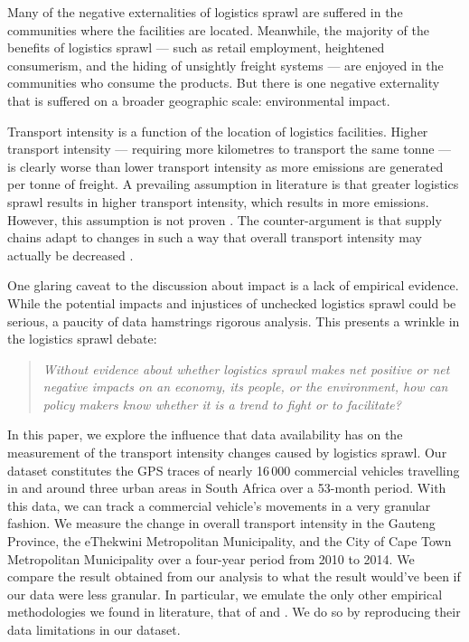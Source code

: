 \documentclass[3p, a4paper, authoryear, 11pt, fleqn, review]{elsarticle}
\newcommand{\nmt}[1]{{\color{red}{~(nmt: #1)}}}
\begin{document}
Many of the negative externalities of logistics sprawl are suffered in the communities where the facilities are located. Meanwhile, the majority of the benefits of logistics sprawl --- such as retail employment, heightened consumerism, and the hiding of unsightly freight systems --- are enjoyed in the communities who consume the products. But there is one negative externality that is suffered on a broader geographic scale: environmental impact. \nmt{Address for reviewer 3}

Transport intensity is a function of the location of logistics facilities. Higher transport intensity --- requiring more kilometres to transport the same tonne \nmt{address NA4 about energy efficiency} --- is clearly worse than lower transport intensity as more emissions are generated per tonne of freight. A prevailing assumption in literature is that greater logistics sprawl results in higher transport intensity, which results in more emissions. However, this assumption is not proven \citep{AljohaniThompson2016}. The counter-argument is that supply chains adapt to changes in such a way that overall transport intensity may actually be decreased \citep{Kang2020b, Sakai_etal2017}. 

One glaring caveat to the discussion about impact is a lack of empirical evidence. While the potential impacts and injustices of unchecked logistics sprawl could be serious, a paucity of data hamstrings rigorous analysis. This presents a wrinkle in the logistics sprawl debate: 


\begin{quote}
\emph{Without evidence about whether logistics sprawl makes net positive or net negative impacts on an economy, its people, or the environment, how can policy makers know whether it is a trend to fight or to facilitate? }
\end{quote}

\nmt{Can we move the research question sooner, here?}
\nmt{Restructure paragraph according to NA5}In this paper, we explore the influence that data availability has on the measurement of the transport intensity changes caused by logistics sprawl. Our dataset constitutes the GPS traces of nearly 16\,000 commercial vehicles travelling in and around three urban areas in South Africa over a 53-month period. With this data, we can track a commercial vehicle's movements in a very granular fashion. We measure the change in overall transport intensity in the Gauteng Province, the eThekwini Metropolitan Municipality, and the City of Cape Town Metropolitan Municipality over a four-year period from 2010 to 2014. We compare the result obtained from our analysis to what the result would've been if our data were less granular. In particular, we emulate the only other empirical methodologies we found in literature, that of \citet{DablancRakotonarivo2010} and \citet{Sakai_etal2017}. We do so by reproducing their data limitations in our dataset.\nmt{Rewrite sentence NA6}
\nmt{pasted from other manuscript before I shortened it there}
\end{document}
